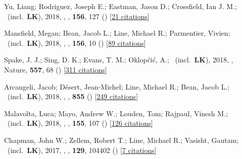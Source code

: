 \item[{\color{numcolor}\scriptsize21}] Yu, Liang; Rodriguez, Joseph E.; Eastman, Jason D.; Crossfield, Ian J. M.; \etal\ (incl.\ \textbf{LK}), 2018, , \aj, \textbf{156}, 127 () [\href{https://ui.adsabs.harvard.edu/abs/2018AJ....156..127Y}{21 citations}]

\item[{\color{numcolor}\scriptsize20}] Mansfield, Megan; Bean, Jacob L.; Line, Michael R.; Parmentier, Vivien; \etal\ (incl.\ \textbf{LK}), 2018, , \aj, \textbf{156}, 10 () [\href{https://ui.adsabs.harvard.edu/abs/2018AJ....156...10M}{89 citations}]

\item[{\color{numcolor}\scriptsize19}] Spake, J. J.; Sing, D. K.; Evans, T. M.; Oklop{\v{c}}i{\'c}, A.; \etal\ (incl.\ \textbf{LK}), 2018, , Nature, \textbf{557}, 68 () [\href{https://ui.adsabs.harvard.edu/abs/2018Natur.557...68S}{311 citations}]

\item[{\color{numcolor}\scriptsize18}] Arcangeli, Jacob; D{\'e}sert, Jean-Michel; Line, Michael R.; Bean, Jacob L.; \etal\ (incl.\ \textbf{LK}), 2018, , \apj, \textbf{855} () [\href{https://ui.adsabs.harvard.edu/abs/2018ApJ...855L..30A}{249 citations}]

\item[{\color{numcolor}\scriptsize17}] Malavolta, Luca; Mayo, Andrew W.; Louden, Tom; Rajpaul, Vinesh M.; \etal\ (incl.\ \textbf{LK}), 2018, , \aj, \textbf{155}, 107 () [\href{https://ui.adsabs.harvard.edu/abs/2018AJ....155..107M}{126 citations}]

\item[{\color{numcolor}\scriptsize16}] Chapman, John W.; Zellem, Robert T.; Line, Michael R.; Vasisht, Gautam; \etal\ (incl.\ \textbf{LK}), 2017, , \pasp, \textbf{129}, 104402 () [\href{https://ui.adsabs.harvard.edu/abs/2017PASP..129j4402C}{7 citations}]

